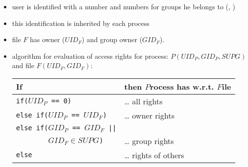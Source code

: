 \begin{slide}
\setlength{\baselineskip}{0.9\baselineskip}
\begin{itemize}
\item user is identified with a  number and numbers for groups he
belongs to (, )
\item this identification is inherited by each process
\item file $F$ has owner ($UID_F$) and group owner ($GID_F$). 
\item algorithm for evaluation of access rights for process:
$P(UID_P,GID_P,SUPG)$ and file $F(UID_F,GID_F)$:
\begin{tabular}{ll}
If & then $P$rocess has w.r.t. $F$ile \\ 
\hline
\texttt{if($UID_P$ == 0)} & \dots{} all rights \\
\texttt{else if($UID_P$ == $UID_F$)} & \dots{} owner rights \\
\texttt{else if($GID_P$ == $GID_F$ ||} &\\
\texttt{~~~~~~~~$GID_F \in SUPG$)} & \dots{} group rights \\
\texttt{else} & \dots{} rights of others
\end{tabular}
\end{itemize}
\end{slide}

